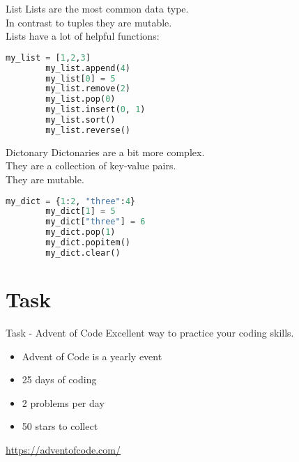 \documentclass{beamer}
\begin{document}
\begin{frame}[fragile]{List}
    Lists are the most common data type.\\\pause
    In contrast to tuples they are mutable.\\\pause
    Lists have a lot of helpful functions:\\
    \begin{lstlisting}[backgroundcolor = \color{lightgray},language=Python]
        my_list = [1,2,3]
        my_list.append(4)
        my_list[0] = 5
        my_list.remove(2)
        my_list.pop(0)
        my_list.insert(0, 1)
        my_list.sort()
        my_list.reverse()
    \end{lstlisting}

\end{frame}

\begin{frame}[fragile]{Dictonary}
    Dictonaries are a bit more complex.\\\pause
    They are a collection of key-value pairs.\\\pause
    They are mutable.\\\pause
    \begin{lstlisting}[backgroundcolor = \color{lightgray},language=Python]
        my_dict = {1:2, "three":4}
        my_dict[1] = 5
        my_dict["three"] = 6
        my_dict.pop(1)
        my_dict.popitem()
        my_dict.clear()
    \end{lstlisting}
\end{frame}

\section{Task}

\begin{frame}{Task - Advent of Code}
    Excellent way to practice your coding skills.\\
    \begin{itemize}
        \item Advent of Code is a yearly event
        \item 25 days of coding
        \item 2 problems per day
        \item 50 stars to collect
    \end{itemize}
    \begin{center}
        \url{https://adventofcode.com/}
    \end{center}
\end{frame}
\end{document}
